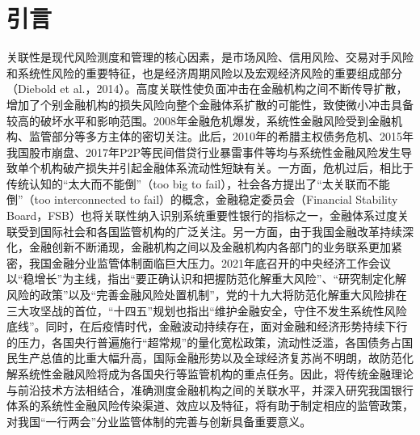 \documentclass[lang=cn]{elegantpaper}
\begin{document}
\section{引言}
关联性是现代风险测度和管理的核心因素，是市场风险、信用风险、交易对手风险和系统性风险的重要特征，也是经济周期风险以及宏观经济风险的重要组成部分（Diebold et al.，2014）\cite{01}。高度关联性使负面冲击在金融机构之间不断传导扩散，增加了个别金融机构的损失风险向整个金融体系扩散的可能性，致使微小冲击具备较高的破坏水平和影响范围。2008年金融危机爆发，系统性金融风险受到金融机构、监管部分等多方主体的密切关注。此后，2010年的希腊主权债务危机、2015年我国股市崩盘、2017年P2P等民间借贷行业暴雷事件等均与系统性金融风险发生导致单个机构破产损失并引起金融体系流动性短缺有关。一方面，危机过后，相比于传统认知的“太大而不能倒”（too big to fail），社会各方提出了“太关联而不能倒”（too interconnected to fail）的概念，金融稳定委员会（Financial Stability Board，FSB）也将关联性纳入识别系统重要性银行的指标之一，金融体系过度关联受到国际社会和各国监管机构的广泛关注。另一方面，由于我国金融改革持续深化，金融创新不断涌现，金融机构之间以及金融机构内各部门的业务联系更加紧密，我国金融分业监管体制面临巨大压力。2021年底召开的中央经济工作会议以“稳增长”为主线，指出“要正确认识和把握防范化解重大风险”、“研究制定化解风险的政策”以及“完善金融风险处置机制”，党的十九大将防范化解重大风险排在三大攻坚战的首位，“十四五”规划也指出“维护金融安全，守住不发生系统性风险底线”。同时，在后疫情时代，金融波动持续存在，面对金融和经济形势持续下行的压力，各国央行普遍施行“超常规”的量化宽松政策，流动性泛滥，各国债务占国民生产总值的比重大幅升高，国际金融形势以及全球经济复苏尚不明朗，故防范化解系统性金融风险将成为各国央行等监管机构的重点任务。因此，将传统金融理论与前沿技术方法相结合，准确测度金融机构之间的关联水平，并深入研究我国银行体系的系统性金融风险传染渠道、效应以及特征，将有助于制定相应的监管政策，对我国“一行两会”分业监管体制的完善与创新具备重要意义。



\end{document}
